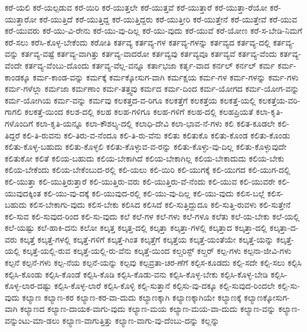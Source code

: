 {ಕರೆ-ಯಲಿ
ಕರೆ-ಯಲ್ಪಡುವ
ಕರೆ-ಯಿರಿ
ಕರೆ-ಯುತ್ತಲೇ
ಕರೆ-ಯುತ್ತವೆ
ಕರೆ-ಯುತ್ತಾರೆ
ಕರೆ-ಯುತ್ತಾ-ರೆಯೋ
ಕರೆ-ಯುತ್ತಾರೋ
ಕರೆ-ಯುತ್ತಿದೆ
ಕರೆ-ಯುತ್ತಿದ್ದ
ಕರೆ-ಯುತ್ತಿದ್ದರು
ಕರೆ-ಯುತ್ತೀರಿ
ಕರೆ-ಯುತ್ತೇನೆ
ಕರೆ-ಯುತ್ತೇವೆ
ಕರೆ-ಯುವ
ಕರೆ-ಯುವರು
ಕರೆ-ಯು-ವಿ-ರೇನು
ಕರೆ-ಯು-ವು-ದಿಲ್ಲ
ಕರೆ-ಯು-ವುದು
ಕರೆ-ಯುವೆ
ಕರೆ-ಯೋಣ
ಕರೆ-ಸ-ಬೇಡಿ-ನಿಮಗೆ
ಕರೆ-ಸಲು
ಕರೆಸಿ-ಕೊಳ್ಳ-ಬೇಕೆಂದು
ಕರೋತಿ
ಕರ್ತವ್ಯ
ಕರ್ತವ್ಯ-ಗಳ
ಕರ್ತವ್ಯ-ಗಳನ್ನು
ಕರ್ತವ್ಯದ
ಕರ್ತವ್ಯ-ದಲ್ಲಿ
ಕರ್ತವ್ಯ-ವನ್ನು
ಕರ್ತವ್ಯ-ವಷ್ಟೆ
ಕರ್ತವ್ಯ-ವಾಗಿತ್ತು
ಕರ್ತವ್ಯ-ವಾದರೋ
ಕರ್ತವ್ಯವು
ಕರ್ತವ್ಯವೂ
ಕರ್ತವ್ಯವೆ
ಕರ್ತವ್ಯ-ವೆಂದು
ಕರ್ತವ್ಯ-ವೆಂದೇ
ಕರ್ತವ್ಯ-ವೆಂಬು-ದೊಂದು
ಕರ್ತವ್ಯ-ವೆಲ್ಲ-ವನ್ನೂ
ಕರ್ತಾಭಜಾ
ಕರ್ತೃ-ವಾದ
ಕರ್ನಲ್
ಕರ್ನಲ್
ಕರ್ಮ
ಕರ್ಮ-ಕಾಂಡಕ್ಕೂ
ಕರ್ಮ-ಕಾಂಡ-ವನ್ನು
ಕರ್ಮಕ್ಕೆ
ಕರ್ಮಕ್ಕೋಸುಗ-ವಾಗಿ
ಕರ್ಮಕ್ಷಯ
ಕರ್ಮ-ಗಳ
ಕರ್ಮ-ಗಳನ್ನು
ಕರ್ಮ-ಗಳು
ಕರ್ಮ-ಗಳೆಲ್ಲಾ
ಕರ್ಮಜಾ
ಕರ್ಮಣಾಂ
ಕರ್ಮ-ತತ್ತ್ವವು
ಕರ್ಮದ
ಕರ್ಮ-ದಿಂದ
ಕರ್ಮ-ಯೋಗದ
ಕರ್ಮ-ಯೋಗ-ವನ್ನು
ಕರ್ಮ-ಯೋಗಿಯ
ಕರ್ಮ-ವನ್ನು
ಕರ್ಮವು
ಕಲಕತ್ತದ-ವ-ರಿಗೂ
ಕಲಕತ್ತೆಗೆ
ಕಲಕತ್ತೆಯ
ಕಲಕತ್ತೆ-ಯಲ್ಲಿ
ಕಲಕತ್ತೆಯ-ವರಿ-ಗಾಗಲಿ
ಕಲಕತ್ತೆ-ಯಿಂದ
ಕಲಶ-ದಲ್ಲಿ
ಕಲಹ
ಕಲಹ-ಗಳಿಗೂ
ಕಲಹ-ಗಳಿಗೆ
ಕಲಹ-ದಲ್ಲಿ
ಕಲಹಪ್ರಿಯತೆ
ಕಲಾ-ಕೃತಿ-ಗಳೊಂದಿಗೆ
ಕಲಾ-ಕೃತಿ-ಯನ್ನೂ
ಕಲಾ-ಕೌಶಲ್ಯ-ದಲ್ಲಿ
ಕಲಾಧಿ-ದೇವಿ
ಕಲಾ-ಭಾವ-ನೆ-ಗಳು
ಕಲಿ
ಕಲಿತ-ಕೂಡಲೇ
ಕಲಿ-ತಿದ್ದರೆ
ಕಲಿ-ತಿ-ರುವನು
ಕಲಿ-ತಿರು-ವ-ನೆಂದೂ
ಕಲಿ-ತಿ-ರು-ವೆನು
ಕಲಿತು
ಕಲಿತುಕೊ
ಕಲಿತು-ಕೊಂಡ
ಕಲಿತು-ಕೊಂಡು
ಕಲಿತು-ಕೊಳ್ಳ-ಬಹುದು
ಕಲಿತು-ಕೊಳ್ಳಲಿ
ಕಲಿತು-ಕೊಳ್ಳುವ-ವ-ರನ್ನು
ಕಲಿತು-ಕೊಳ್ಳು-ವು-ದಿಲ್ಲ
ಕಲಿತು-ಕೊಳ್ಳುವುದೇ
ಕಲಿತುಕೋ
ಕಲಿತೆ
ಕಲಿಯ-ಬಹುದು
ಕಲಿಯ-ಬೇಕಾಗಿದೆ
ಕಲಿಯ-ಬೇಕಾಗಿಲ್ಲ
ಕಲಿಯ-ಬೇಕಾದುದು
ಕಲಿಯ-ಬೇಕು
ಕಲಿಯ-ಬೇಕೆಂದು
ಕಲಿಯ-ಬೇಕೆಂಬುದ-ರಲ್ಲಿ
ಕಲಿ-ಯಲು
ಕಲಿ-ಯಿರಿ
ಕಲಿ-ಯುಗಕ್ಕೆ
ಕಲಿ-ಯುಗದ
ಕಲಿ-ಯುಗ-ದಲ್ಲಿ
ಕಲಿ-ಯುತ್ತಾ
ಕಲಿ-ಯುತ್ತಿರುತ್ತಾರೆ
ಕಲಿ-ಯುತ್ತಿರು-ವರು
ಕಲಿ-ಯುತ್ತಿರು-ವೆ-ನೆಂದು
ಕಲಿ-ಯುವ
ಕಲಿ-ಯುವರೇ
ಕಲಿ-ಯುವುದಕ್ಕಿಂತ
ಕಲಿ-ಯು-ವು-ದಕ್ಕೆ
ಕಲಿ-ಯುವುದ-ರಲ್ಲಿ
ಕಲಿ-ಯು-ವು-ದಿಲ್ಲ
ಕಲಿ-ಯು-ವುದು
ಕಲಿಸ-ಬಲ್ಲೆ
ಕಲಿಸ-ಬಹುದು
ಕಲಿಸ-ಬೇಕಾಗು-ವುದು
ಕಲಿಸ-ಬೇಕು
ಕಲಿಸಿದ
ಕಲಿಸಿದೆ
ಕಲಿ-ಸುತ್ತಿದ್ದುದೂ
ಕಲಿ-ಸುತ್ತಿ-ರುವಳು
ಕಲಿ-ಸುತ್ತೇನೆ
ಕಲಿ-ಸುವ
ಕಲಿ-ಸುವುದ-ರಿಂದ
ಕಲಿ-ಸು-ವುದು
ಕಲೆ
ಕಲೆ-ಗಳ
ಕಲೆ-ಗಳು
ಕಲೆ-ಗಳೂ
ಕಲೆತು
ಕಲೆ-ಯ-ಬೇಕು
ಕಲೆ-ಯಲ್ಲಿ
ಕಲೆ-ಯಷ್ಟು
ಕಲೆ-ಹಾಕಿ-ದನು
ಕಲೋ
ಕಲ್ಕತ್ತ
ಕಲ್ಕತ್ತ-ದಲ್ಲಿ
ಕಲ್ಕತ್ತಾ
ಕಲ್ಕತ್ತಾ-ಗಳಲ್ಲಿ
ಕಲ್ಕತ್ತಾದ
ಕಲ್ಕತ್ತಾ-ದಲ್ಲಿ
ಕಲ್ಕತ್ತಾ-ದ-ವರು
ಕಲ್ಕತ್ತೆ
ಕಲ್ಕತ್ತೆ-ಗಳಲ್ಲಿ
ಕಲ್ಕತ್ತೆ-ಗಳಿಗೆ
ಕಲ್ಕತ್ತೆ-ಗಿಂತ
ಕಲ್ಕತ್ತೆಗೆ
ಕಲ್ಕತ್ತೆಯ
ಕಲ್ಕತ್ತೆ-ಯಂತೆಯೇ
ಕಲ್ಕತ್ತೆ-ಯನ್ನು
ಕಲ್ಕತ್ತೆ-ಯಲ್ಲಿ
ಕಲ್ಕತ್ತೆ-ಯಲ್ಲಿ-ರುವ
ಕಲ್ಕತ್ತೆ-ಯಲ್ಲಿ-ರು-ವೆನು
ಕಲ್ಕತ್ತೆ-ಯಿಂದ
ಕಲ್ಚರಿಸ್ಟ್
ಕಲ್ಚರ್
ಕಲ್ಪ-ಗಳು
ಕಲ್ಪನಾ-ಜೀವಿ-ಗಳು
ಕಲ್ಪನೆ
ಕಲ್ಪನೆ-ಗಳು
ಕಲ್ಪ-ನೆಯ
ಕಲ್ಪನೆ-ಯನ್ನು
ಕಲ್ಪವು
ಕಲ್ಪವ್ರತಾ-ಚರ-ಣೆಗೆ
ಕಲ್ಪಿಸ-ಕೂಡದು
ಕಲ್ಪಿ-ಸದೇ
ಕಲ್ಪಿ-ಸಲು
ಕಲ್ಪಿಸಿ
ಕಲ್ಪಿಸಿ-ಕೊಂಡು
ಕಲ್ಪಿಸಿ-ಕೊಂಡೆ
ಕಲ್ಪಿಸಿ-ಕೊಡಿ
ಕಲ್ಪಿಸಿ-ಕೊಡು-ವನು
ಕಲ್ಪಿಸಿ-ಕೊಳ್ಳ-ಬೇಕು
ಕಲ್ಪಿಸಿ-ಕೊಳ್ಳ-ಬೇಡಿ
ಕಲ್ಪಿಸಿ-ಕೊಳ್ಳ-ಲಾರ-ದಷ್ಟು
ಕಲ್ಪಿಸಿ-ಕೊಳ್ಳ-ಲಾರೆ
ಕಲ್ಪಿಸಿ-ಕೊಳ್ಳಿ
ಕಲ್ಪಿ-ಸುತ್ತಾನೆ
ಕಲ್ಪಿಸು-ವು-ದಕ್ಕೂ
ಕಲ್ಪಿ-ಸುವುದ-ರಿಂದಲೇ
ಕಲ್ಪಿ-ಸು-ವುದು
ಕಲ್ಯಾಣ
ಕಲ್ಯಾಣ-ಕರ
ಕಲ್ಯಾಣ-ಕರ-ವಾ-ದುದು
ಕಲ್ಯಾಣಕ್ಕಾಗಿ
ಕಲ್ಯಾಣಕ್ಕಾಗಿಯೇ
ಕಲ್ಯಾಣಕ್ಕೆ
ಕಲ್ಯಾಣಕ್ಕೋಸುಗ-ವಾಗಿ
ಕಲ್ಯಾಣದ
ಕಲ್ಯಾಣ-ದಾಯಕ-ವಾಗು-ವುದು
ಕಲ್ಯಾಣ-ಮಯ
ಕಲ್ಯಾಣ-ಮಯ-ವಾ-ದುದು
ಕಲ್ಯಾಣ-ವನ್ನು
ಕಲ್ಯಾಣ-ವನ್ನುಂಟು-ಮಾ-ಡಲು
ಕಲ್ಯಾಣ-ವಾಗುತ್ತಿತ್ತು
ಕಲ್ಯಾಣ-ವಾಗು-ವು-ದೆಂಬು-ದನ್ನು
ಕಲ್ಲನ್ನು
}
